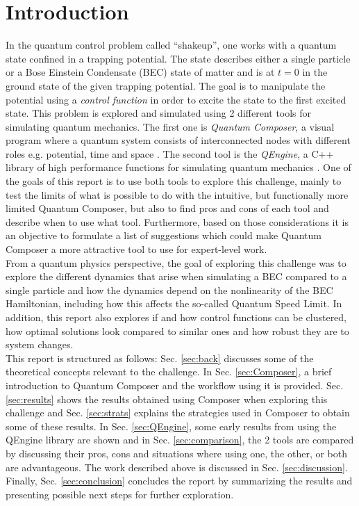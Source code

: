 \documentclass[a4paper, twocolumn]{revtex4-1}
\begin{document}
\section{Introduction}
In the quantum control problem called ``shakeup'', one works with a quantum state confined in a trapping potential. The state describes either a single particle or a Bose Einstein Condensate (BEC) state of matter and is at $t=0$ in the ground state of the given trapping potential. The goal is to manipulate the potential using a \textit{control function} in order to excite the state to the first excited state. This problem is explored and simulated using 2 different tools for simulating quantum mechanics. The first one is \textit{Quantum Composer}, a visual program where a quantum system consists of interconnected nodes with different roles e.g. potential, time and space \cite{ahmed2020quantum}. The second tool is the \textit{QEngine}, a C++ library of high performance functions for simulating quantum mechanics \cite{QEngine}. One of the goals of this report is to use both tools to explore this challenge, mainly to test the limits of what is possible to do with the intuitive, but functionally more limited Quantum Composer, but also to find pros and cons of each tool and describe when to use what tool. Furthermore, based on those considerations it is an objective to formulate a list of suggestions which could make Quantum Composer a more attractive tool to use for expert-level work.\\

From a quantum physics perspective, the goal of exploring this challenge was to explore the different dynamics that arise when simulating a BEC compared to a single particle and how the dynamics depend on the nonlinearity of the BEC Hamiltonian, including how this affects the so-called Quantum Speed Limit. In addition, this report also explores if and how control functions can be clustered, how optimal solutions look compared to similar ones and how robust they are to system changes.\\

This report is structured as follows: Sec. \ref{sec:back} discusses some of the theoretical concepts relevant to the challenge. In Sec. \ref{sec:Composer}, a brief introduction to Quantum Composer and the workflow using it is provided. Sec. \ref{sec:results} shows the results obtained using Composer when exploring this challenge and Sec. \ref{sec:strats} explains the strategies used in Composer to obtain some of these results. In Sec. \ref{sec:QEngine}, some early results from using the QEngine library are shown and in Sec. \ref{sec:comparison}, the 2 tools are compared by discussing their pros, cons and situations where using one, the other, or both are advantageous. The work described above is discussed in Sec. \ref{sec:discussion}. Finally, Sec. \ref{sec:conclusion} concludes the report by summarizing the results and presenting possible next steps for further exploration.
\end{document}
